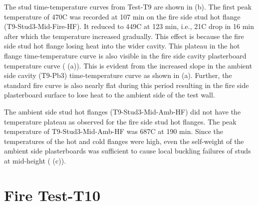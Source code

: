 The stud time-temperature curves from Test-T9 are shown in  (b). The first peak temperature of 470\degree C was recorded at 107 min on the fire side stud hot flange (T9-Stud3-Mid-Fire-HF). It reduced to 449\degree C at 123 min, i.e., 21\degree C drop in 16 min after which the temperature increased gradually. This effect is because the fire side stud hot flange losing heat into the wider cavity. This plateau in the hot flange time-temperature curve is also visible in the fire side cavity plasterboard temperature curve ( (a)). This is evident from the increased slope in the ambient side cavity (T9-Pb3) time-temperature curve as shown in  (a). Further, the standard fire curve is also nearly flat during this period resulting in the fire side plasterboard surface to lose heat to the ambient side of the test wall.  

The ambient side stud hot flanges (T9-Stud3-Mid-Amb-HF) did not have the temperature plateau as observed for the fire side stud hot flanges. The peak temperature of T9-Stud3-Mid-Amb-HF was 687\degree C at 190 min. Since the temperatures of the hot and cold flanges were high, even the self-weight of the ambient side plasterboards was sufficient to cause local buckling failures of studs at mid-height ( (c)).

\section{Fire Test-T10}

